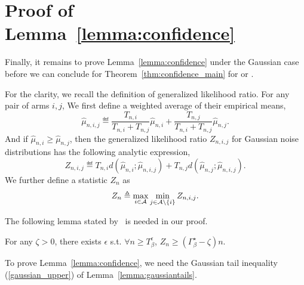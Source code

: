 \section{Proof of Lemma~\ref{lemma:confidence}}\label{app:t3c.confidence}

Finally, it remains to prove Lemma~\ref{lemma:confidence} under the Gaussian case before we can conclude for Theorem~\ref{thm:confidence_main} for \TTTS or \TCC.

\restatefixedconfidence*

For the clarity, we recall the definition of generalized likelihood ratio. For any pair of arms $i, j$, We first define a weighted average of their empirical means,
\[
    \hat{\mu}_{n,i,j} \eqdef \frac{T_{n,i}}{T_{n,i}+T_{n,j}} \hat{\mu}_{n,i} + \frac{T_{n,j}}{T_{n,i}+T_{n,j}} \hat{\mu}_{n,j}.
\]
And if $\hat{\mu}_{n,i}\geq\hat{\mu}_{n,j}$, then the generalized likelihood ratio $Z_{n,i,j}$ for Gaussian noise distributions has the following analytic expression,
\[
    Z_{n,i,j} \eqdef T_{n,i}d(\hat{\mu}_{n,i};\hat{\mu}_{n,i,j}) + T_{n,j}d(\hat{\mu}_{n,j};\hat{\mu}_{n,i,j}).
\]
We further define a statistic $Z_n$ as
\[
    Z_n \triangleq \max_{i\in\mathcal{A}}\min_{j\in\mathcal{A}\backslash\left\{i\right\}} Z_{n,i,j}.
\]

The following lemma stated by~\citet{qin2017ttei} is needed in our proof.

\begin{lemma}\label{lemma:ttei}
    For any $\zeta > 0$, there exists $\epsilon$ s.t. $\forall n\geq T_{\beta}^\epsilon$, $Z_n\geq (\Gamma_{\beta}^\star-\zeta)n$.
\end{lemma}

To prove Lemma~\ref{lemma:confidence}, we need the Gaussian tail inequality (\ref{gaussian_upper}) of Lemma~\ref{lemma:gaussiantails}.

